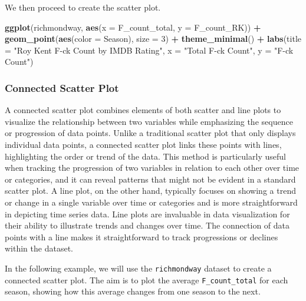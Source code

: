 \documentclass[
]{book}
\newenvironment{Shaded}{\begin{snugshade}}{\end{snugshade}}
\newcommand{\AttributeTok}[1]{\textcolor[rgb]{0.13,0.29,0.53}{#1}}
\newcommand{\DecValTok}[1]{\textcolor[rgb]{0.00,0.00,0.81}{#1}}
\newcommand{\FunctionTok}[1]{\textcolor[rgb]{0.13,0.29,0.53}{\textbf{#1}}}
\newcommand{\NormalTok}[1]{#1}
\newcommand{\SpecialCharTok}[1]{\textcolor[rgb]{0.81,0.36,0.00}{\textbf{#1}}}
\newcommand{\StringTok}[1]{\textcolor[rgb]{0.31,0.60,0.02}{#1}}
\begin{document}
We then proceed to create the scatter plot.

\begin{Shaded}
\begin{Highlighting}[]
\FunctionTok{ggplot}\NormalTok{(richmondway, }\FunctionTok{aes}\NormalTok{(}\AttributeTok{x =}\NormalTok{ F\_count\_total, }\AttributeTok{y =}\NormalTok{ F\_count\_RK)) }\SpecialCharTok{+}
  \FunctionTok{geom\_point}\NormalTok{(}\FunctionTok{aes}\NormalTok{(}\AttributeTok{color =}\NormalTok{ Season), }\AttributeTok{size =} \DecValTok{3}\NormalTok{) }\SpecialCharTok{+}
  \FunctionTok{theme\_minimal}\NormalTok{() }\SpecialCharTok{+} 
  \FunctionTok{labs}\NormalTok{(}\AttributeTok{title =} \StringTok{"Roy Kent F{-}ck Count by IMDB Rating"}\NormalTok{,}
       \AttributeTok{x =} \StringTok{"Total F{-}ck Count"}\NormalTok{,}
       \AttributeTok{y =} \StringTok{"F{-}ck Count"}\NormalTok{)}
\end{Highlighting}
\end{Shaded}

\subsubsection*{Connected Scatter Plot}\label{connected-scatter-plot}

A connected scatter plot combines elements of both scatter and line plots to visualize the relationship between two variables while emphasizing the sequence or progression of data points. Unlike a traditional scatter plot that only displays individual data points, a connected scatter plot links these points with lines, highlighting the order or trend of the data. This method is particularly useful when tracking the progression of two variables in relation to each other over time or categories, and it can reveal patterns that might not be evident in a standard scatter plot. A line plot, on the other hand, typically focuses on showing a trend or change in a single variable over time or categories and is more straightforward in depicting time series data. Line plots are invaluable in data visualization for their ability to illustrate trends and changes over time. The connection of data points with a line makes it straightforward to track progressions or declines within the dataset.

In the following example, we will use the \texttt{richmondway} dataset to create a connected scatter plot. The aim is to plot the average \texttt{F\_count\_total} for each season, showing how this average changes from one season to the next.
\end{document}
